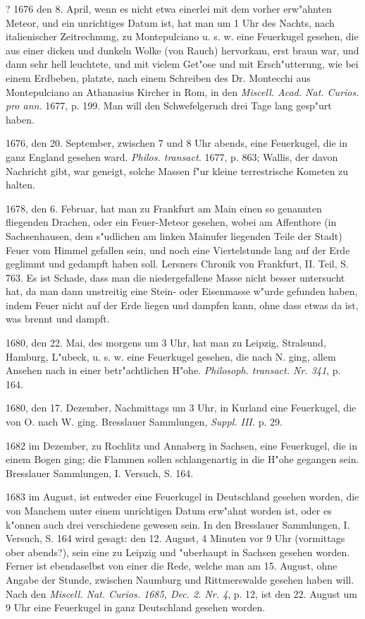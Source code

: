 \documentclass[a4paper, 11pt, oneside, polutonikogreek, german]{article}
\begin{document}
? 1676 den 8. April, wenn es nicht etwa einerlei mit dem vorher erw"ahnten Meteor, und ein unrichtiges Datum ist, hat man um 1 Uhr des Nachts, nach italienischer Zeitrechnung, zu Montepulciano u. s. w. eine Feuerkugel gesehen, die aus einer dicken und dunkeln Wolke (von Rauch) hervorkam, erst braun war, und dann sehr hell leuchtete, und mit vielem Get"ose und mit Ersch"utterung, wie bei einem Erdbeben, platzte, nach einem Schreiben des Dr. Montecchi aus Montepulciano an Athanasius Kircher in Rom, in den \emph{Miscell. Acad. Nat. Curios. pro ann.} 1677, p. 199. Man will den Schwefelgeruch drei Tage lang gesp"urt haben.

1676, den 20. September, zwischen 7 und 8 Uhr abends, eine Feuerkugel, die in ganz England gesehen ward. \emph{Philos. transact.} 1677, p. 863; Wallis, der davon Nachricht gibt, war geneigt, solche Massen f"ur kleine terrestrische Kometen zu halten.

1678, den 6. Februar, hat man zu Frankfurt am Main einen so genannten fliegenden Drachen, oder ein Feuer-Meteor gesehen, wobei am Affenthore (in Sachsenhausen, dem s"udlichen am linken Mainufer liegenden Teile der Stadt) Feuer vom Himmel gefallen sein, und noch eine Viertelstunde lang auf der Erde geglimmt und gedampft haben soll. Lersners Chronik von Frankfurt, II. Teil, S. 763. Es ist Schade, dass man die niedergefallene Masse nicht besser untersucht hat, da man dann unstreitig eine Stein- oder Eisenmasse w"urde gefunden haben, indem Feuer nicht auf der Erde liegen und dampfen kann, ohne dass etwas da ist, was brennt und dampft.

1680, den 22. Mai, des morgens um 3 Uhr, hat man zu Leipzig, Stralsund, Hamburg, L"ubeck, u. s. w. eine Feuerkugel gesehen, die nach N. ging, allem Ansehen nach in einer betr"achtlichen H"ohe. \emph{Philosoph. transact. Nr. 341}, p. 164.

1680, den 17. Dezember, Nachmittags um 3 Uhr, in Kurland eine Feuerkugel, die von O. nach W. ging. Bresslauer Sammlungen, \emph{Suppl. III.} p. 29.

1682 im Dezember, zu Rochlitz und Annaberg in Sachsen, eine Feuerkugel, die in einem Bogen ging; die Flammen sollen schlangenartig in die H"ohe gegangen sein. Bresslauer Sammlungen, I. Versuch, S. 164.

1683 im August, ist entweder eine Feuerkugel in Deutschland gesehen worden, die von Manchem unter einem unrichtigen Datum erw"ahnt worden ist, oder es k"onnen auch drei verschiedene gewesen sein. In den Bresslauer Sammlungen, I. Versuch, S. 164 wird gesagt: den 12. August, 4 Minuten vor 9 Uhr (vormittags ober abends?), sein eine zu Leipzig und "uberhaupt in Sachsen gesehen worden. Ferner ist ebendaselbst von einer die Rede, welche man am 15. August, ohne Angabe der Stunde, zwischen Naumburg und Rittmerswalde gesehen haben will. Nach den \emph{Miscell. Nat. Curios. 1685, Dec. 2. Nr. 4}, p. 12, ist den 22. August um 9 Uhr eine Feuerkugel in ganz Deutschland gesehen worden.
\end{document}
